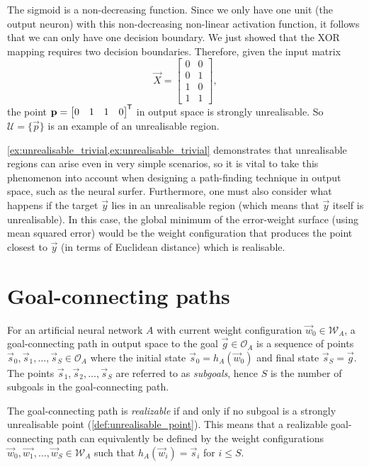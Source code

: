 \begin{example}
    The sigmoid is a non-decreasing function.
    Since we only have one unit (the output neuron) with this non-decreasing non-linear activation function, it follows that we can only have one decision boundary.
    We just showed that the XOR mapping requires two decision boundaries.
    Therefore, given the input matrix
    \begin{equation*}
        \vec{X} = \begin{bmatrix}
            0 & 0 \\
            0 & 1 \\
            1 & 0 \\
            1 & 1
        \end{bmatrix},
    \end{equation*}
    the point
    $
        \mathbf{p} = \begin{bmatrix}
            0 & 1 & 1 & 0
        \end{bmatrix}^{\mkern-1.5mu\mathsf{T}}
    $
    in output space is strongly unrealisable.
    So $\mathcal{U} = \{\vec{p}\}$ is an example of an unrealisable region.    
\end{example}

\begin{remark}
    \ref{ex:unrealisable_trivial,ex:unrealisable_trivial} demonstrates that unrealisable regions can arise even in very simple scenarios, so it is vital to take this phenomenon into account when designing a path-finding technique in output space, such as the neural surfer.
    Furthermore, one must also consider what happens if the target $\vec{y}$ lies in an unrealisable region (which means that $\vec{y}$ itself is unrealisable).
    In this case, the global minimum of the error-weight surface (using mean squared error) would be the weight configuration that produces the point closest to $\vec{y}$ (in terms of Euclidean distance) which is realisable.
\end{remark}

\section{Goal-connecting paths}
\begin{definition}
    \label{def:goal_connecting_path}
    For an artificial neural network $A$ with current weight configuration $\vec{w}_0 \in \mathcal{W}_A$, a goal-connecting path in output space to the goal $\vec{g}\in \mathcal{O}_A$ is a sequence of points $\vec{s}_0, \vec{s}_1,\dots,\vec{s}_{S} \in \mathcal{O}_A$ where the initial state $\vec{s}_0 = h_A(\vec{w}_0)$ and final state $\vec{s}_S=\vec{g}$.
    The points $\vec{s}_1,\vec{s}_2,\dots,\vec{s}_S$ are referred to as \textit{subgoals}, hence $S$ is the number of subgoals in the goal-connecting path. 

    The goal-connecting path is \textit{realizable} if and only if no subgoal is a strongly unrealisable point (\ref{def:unrealisable_point}).
    This means that a realizable goal-connecting path can equivalently be defined by the weight configurations $\vec{w}_0, \vec{w_1},\dots,\vec{w}_S \in \mathcal{W}_A$ such that $h_A(\vec{w}_i) = \vec{s}_i$ for $i \leq S$.
\end{definition}

